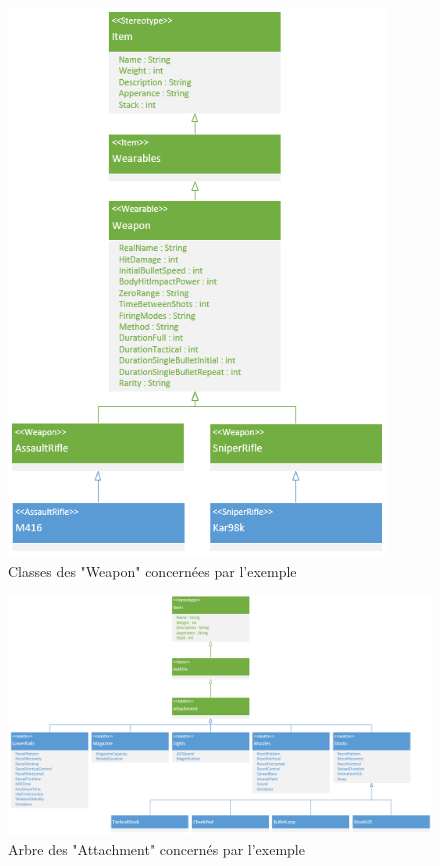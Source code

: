 \begin{figure}[H]
    \centering
    \includegraphics[width=10cm]{10_img/chap6/weapons.PNG} 
    \caption{Classes des "Weapon" concernées par l'exemple}
\end{figure}

\begin{figure}[H]
    \centering
    \includegraphics[width=14cm]{10_img/chap6/attachments_stocks.PNG} 
    \caption{Arbre des "Attachment" concernés par l'exemple}
\end{figure}

